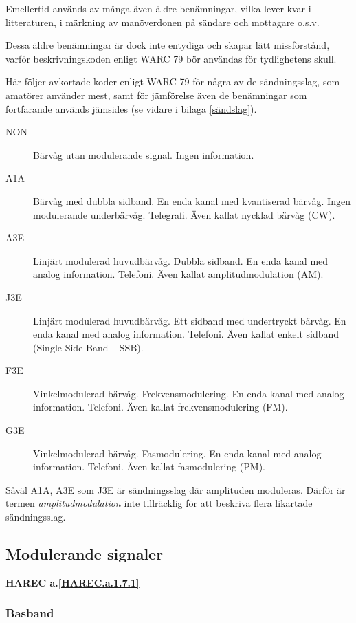 Emellertid används av många även äldre benämningar, vilka lever kvar i
litteraturen, i märkning av manöverdonen på sändare och mottagare o.s.v.

Dessa äldre benämningar är dock inte entydiga och skapar lätt missförstånd,
varför beskrivningskoden enligt WARC 79 bör användas för tydlighetens skull.

Här följer avkortade koder enligt WARC 79 för några av de sändningsslag, som
amatörer använder mest, samt för jämförelse även de benämningar som fortfarande
används jämsides (se vidare i bilaga \ref{sändslag}).

\begin{description}
\item[NON] Bärvåg utan modulerande signal. Ingen information.

\item[A1A] Bärvåg med dubbla sidband. En enda kanal med kvantiserad bärvåg.
Ingen modulerande underbärvåg. Telegrafi. Även kallat nycklad bärvåg (CW).

\item[A3E] Linjärt modulerad huvudbärvåg. Dubbla sidband. En enda kanal med
analog information. Telefoni. Även kallat amplitudmodulation (AM).

\item[J3E] Linjärt modulerad huvudbärvåg. Ett sidband med undertryckt bärvåg.
En enda kanal med analog information. Telefoni. Även kallat enkelt sidband (Single Side Band -- SSB).

\item[F3E] Vinkelmodulerad bärvåg. Frekvensmodulering. En enda kanal med analog
information. Telefoni. Även kallat frekvensmodulering (FM).

\item[G3E] Vinkelmodulerad bärvåg. Fasmodulering. En enda kanal med analog
information. Telefoni. Även kallat fasmodulering (PM).
\end{description}

Såväl A1A, A3E som J3E är sändningsslag där amplituden moduleras.
Därför är termen \emph{amplitudmodulation} inte tillräcklig för att beskriva
flera likartade sändningsslag.

\subsection{Modulerande signaler}
\textbf{HAREC a.\ref{HAREC.a.1.7.1}\label{myHAREC.a.1.7.1}}

\subsubsection{Basband}

